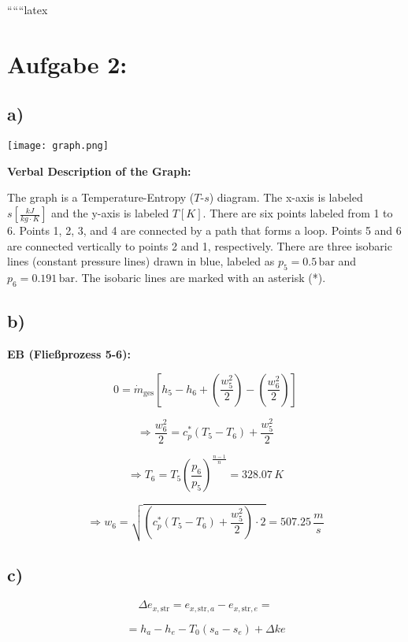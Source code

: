 
``````latex


\section*{Aufgabe 2:}

\subsection*{a)}

\begin{center}
\texttt{[image: graph.png]}
\end{center}

\textbf{Verbal Description of the Graph:}

The graph is a Temperature-Entropy ($T$-$s$) diagram. The x-axis is labeled $s \left[ \frac{kJ}{kg \cdot K} \right]$ and the y-axis is labeled $T \left[ K \right]$. There are six points labeled from 1 to 6. Points 1, 2, 3, and 4 are connected by a path that forms a loop. Points 5 and 6 are connected vertically to points 2 and 1, respectively. There are three isobaric lines (constant pressure lines) drawn in blue, labeled as $p_5 = 0.5 \, \text{bar}$ and $p_6 = 0.191 \, \text{bar}$. The isobaric lines are marked with an asterisk (*).

\subsection*{b)}

\textbf{EB (Fließprozess 5-6):}

\[
0 = \dot{m}_{\text{ges}} \left[ h_5 - h_6 + \left( \frac{w_5^2}{2} \right) - \left( \frac{w_6^2}{2} \right) \right]
\]

\[
\Rightarrow \frac{w_6^2}{2} = c_p^* (T_5 - T_6) + \frac{w_5^2}{2}
\]

\[
\Rightarrow T_6 = T_5 \left( \frac{p_6}{p_5} \right)^{\frac{n-1}{n}} = 328.07 \, K
\]

\[
\Rightarrow w_6 = \sqrt{ \left( c_p^* (T_5 - T_6) + \frac{w_5^2}{2} \right) \cdot 2 } = 507.25 \, \frac{m}{s}
\]

\subsection*{c)}

\[
\Delta e_{x, \text{str}} = e_{x, \text{str}, a} - e_{x, \text{str}, e} =
\]

\[
= h_a - h_e - T_0 (s_a - s_e) + \Delta ke
\]

